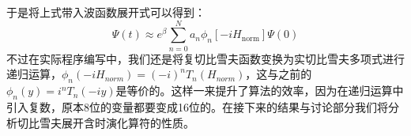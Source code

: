 于是将上式带入波函数展开式可以得到：
\begin{equation}
  \Psi(t) \approx e^{\beta} \sum_{n=0}^{N} a_n \phi_n[-i H_{\text{norm}}] \Psi(0)
  \label{eq:cheby_equation}
\end{equation}
不过在实际程序编写中，我们还是将复切比雪夫函数变换为实切比雪夫多项式进行递归运算，$\phi_n(-iH_{norm}) = {(-i)}^{n}T_n(H_{norm})$，这与之前的$\phi_n(y) = i^n T_n(-iy)$是等价的。这样一来提升了算法的效率，因为在递归运算中引入复数，原本8位的变量都要变成16位的。在接下来的结果与讨论部分我们将分析切比雪夫展开含时演化算符的性质。

                  